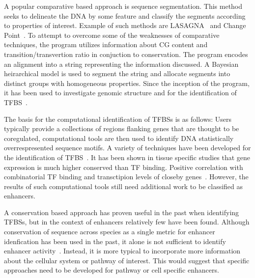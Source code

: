         A popular comparative based approach is sequence segmentation. This method seeks to delineate the DNA by some feature and classify the segments according to properties of interest.
        Example of such methods are LASAGNA~\cite{lee2013lasagna} and Change Point~\cite{keith2006segmenting}. To attempt to overcome some of the weaknesses of comparative techniques, the program utilizes information about CG content and transition/transvertion ratio in conjuction to conservation. The program encodes an alignment into a string representing the information discussed. A Bayesian heirarchical model is used to segment the string and allocate segments into distinct groups with homogeneous properties. Since the inception of the program, it has been used to investigate genomic structure and for the identification of TFBS~\cite{algama2014investigating, algama2017genome}. 



        
        The basis for the computational identification of TFBSs is as follows: Users typically provide a collections of regions flanking genes that are thought to be coregulated, computational tools are then used to identify DNA statistically overrespresented sequence motifs. A variety of techniques have been developed for the identification of TFBS~\cite{tompa2005assessing}. It has been shown in tissue specific studies that gene expression is much higher conserved than TF binding. Positive correlation with combinatorial TF binding and transctipion levels of closeby genes~\cite{wong2014decoupling}. However, the results of such computational tools still need additional work to be classified as enhancers. 
        
        A conservation based approach has proven useful in the past when identifying TFBSs, but in the context of enhancers relatively few have been found. Although conservation of sequence across species as a single metric for enhancer idenfication has been used in the past, it alone is not sufficient to identify enhancer activity~\cite{blow2010chip}. Instead, it is more typical to incorporate more information about the cellular system or pathway of interest. 
        This would suggest that specific approaches need to be developed for pathway or cell specific enhancers. 


